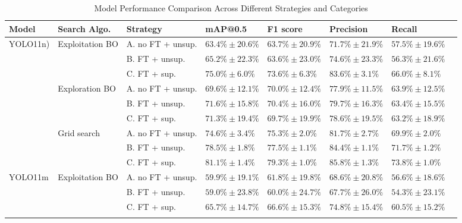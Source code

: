 \begin{table}[H]
\centering
\caption{Model Performance Comparison Across Different Strategies and Categories}
\label{tab:s2_performance}
\small
    \begin{tabular}{llllllll}
    \toprule
    \textbf{Model} & \textbf{Search Algo.} & \textbf{Strategy} & \textbf{mAP@0.5} & \textbf{F1 score} & \textbf{Precision} & \textbf{Recall} \\
    \midrule
    \multirow{9}{*}{YOLO11n)} & \multirow{3}{*}{Exploitation BO} & A. no FT + unsup. & $63.4\% \pm 20.6\% $ & $63.7\% \pm 20.9\% $ & $71.7\% \pm 21.9\% $ & $57.5\% \pm 19.6\% $ \\ 
    &  & B. FT + unsup. & $65.2\% \pm 22.3\% $ & $63.6\% \pm 23.0\% $ & $74.6\% \pm 23.3\% $ & $56.3\% \pm 21.6\% $ \\ 
    &  & C. FT + sup. & $75.0\% \pm 6.0\% $ & $73.6\% \pm 6.3\% $ & $83.6\% \pm 3.1\% $ & $66.0\% \pm 8.1\% $ \\ 
    \cmidrule{2-7}
    & \multirow{3}{*}{Exploration BO} & A. no FT + unsup. & $69.6\% \pm 12.1\% $ & $70.0\% \pm 12.4\% $ & $77.9\% \pm 11.5\% $ & $63.9\% \pm 12.5\% $ \\ 
    &  & B. FT + unsup. & $71.6\% \pm 15.8\% $ & $70.4\% \pm 16.0\% $ & $79.7\% \pm 16.3\% $ & $63.4\% \pm 15.5\% $ \\ 
    &  & C. FT + sup. & $71.3\% \pm 19.4\% $ & $69.7\% \pm 19.9\% $ & $78.6\% \pm 19.5\% $ & $63.2\% \pm 18.9\% $ \\ 
    \cmidrule{2-7}
    & \multirow{3}{*}{Grid search} & A. no FT + unsup. & $74.6\% \pm 3.4\% $ & $75.3\% \pm 2.0\% $ & $81.7\% \pm 2.7\% $ & $69.9\% \pm 2.0\% $ \\ 
    &  & B. FT + unsup. & $78.5\% \pm 1.8\% $ & $77.5\% \pm 1.1\% $ & $84.4\% \pm 1.1\% $ & $71.7\% \pm 1.2\% $ \\ 
    &  & C. FT + sup. & $81.1\% \pm 1.4\% $ & $79.3\% \pm 1.0\% $ & $85.8\% \pm 1.3\% $ & $73.8\% \pm 1.0\% $ \\ 
    \midrule
    \multirow{9}{*}{YOLO11m} & \multirow{3}{*}{Exploitation BO} & A. no FT + unsup. & $59.9\% \pm 19.1\% $ & $61.8\% \pm 19.8\% $ & $68.6\% \pm 20.8\% $ & $56.6\% \pm 18.6\% $ \\ 
    &  & B. FT + unsup. & $59.0\% \pm 23.8\% $ & $60.0\% \pm 24.7\% $ & $67.7\% \pm 26.0\% $ & $54.3\% \pm 23.1\% $ \\ 
    &  & C. FT + sup. & $65.7\% \pm 14.7\% $ & $66.6\% \pm 15.3\% $ & $74.8\% \pm 15.4\% $ & $60.5\% \pm 15.2\% $ \\ 
    \cmidrule{2-7}

\end{tabular}
\end{table}
